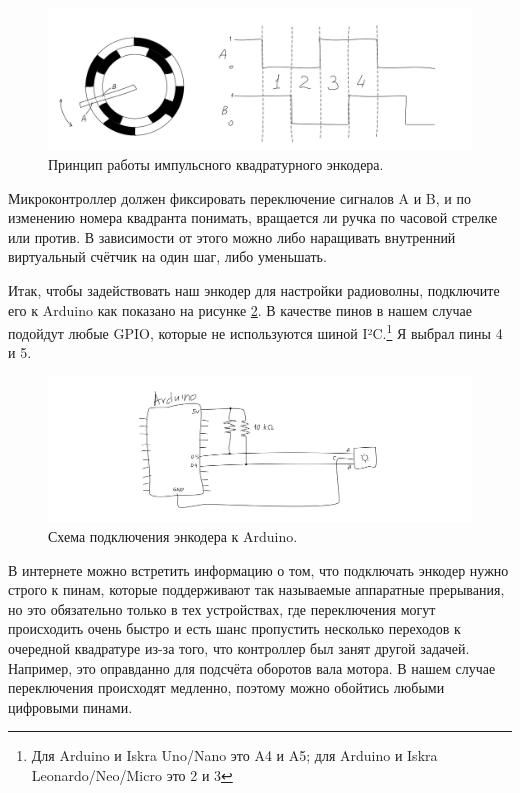 \begin{figure}
  \centering
  \includegraphics{sketches/quadrature-encoder-internals}
  \caption{Принцип работы импульсного квадратурного энкодера.}
  \label{fig:quadrature-encoder}
\end{figure}

Микроконтроллер должен фиксировать переключение сигналов A и B, и по изменению номера квадранта понимать, вращается ли ручка по часовой стрелке или против. В зависимости от этого можно либо наращивать внутренний виртуальный счётчик на один шаг, либо уменьшать.

Итак, чтобы задействовать наш энкодер для настройки радиоволны, подключите его к Arduino как показано на рисунке \ref{encoder-wiring}. В качестве пинов в нашем случае подойдут любые GPIO, которые не используются шиной I²C.\footnote{Для Arduino и Iskra Uno/Nano это A4 и A5; для Arduino и Iskra Leonardo/Neo/Micro это 2 и 3} Я выбрал пины 4 и 5.

\begin{figure}
  \centering
  \includegraphics{sketches/encoder-wiring}
  \caption{Схема подключения энкодера к Arduino.}
  \label{encoder-wiring}
\end{figure}

В интернете можно встретить информацию о том, что подключать энкодер нужно строго к пинам, которые поддерживают так называемые аппаратные прерывания, но это обязательно только в тех устройствах, где переключения могут происходить очень быстро и есть шанс пропустить несколько переходов к очередной квадратуре из-за того, что контроллер был занят другой задачей. Например, это оправданно для подсчёта оборотов вала мотора. В нашем случае переключения происходят медленно, поэтому можно обойтись любыми цифровыми пинами.

